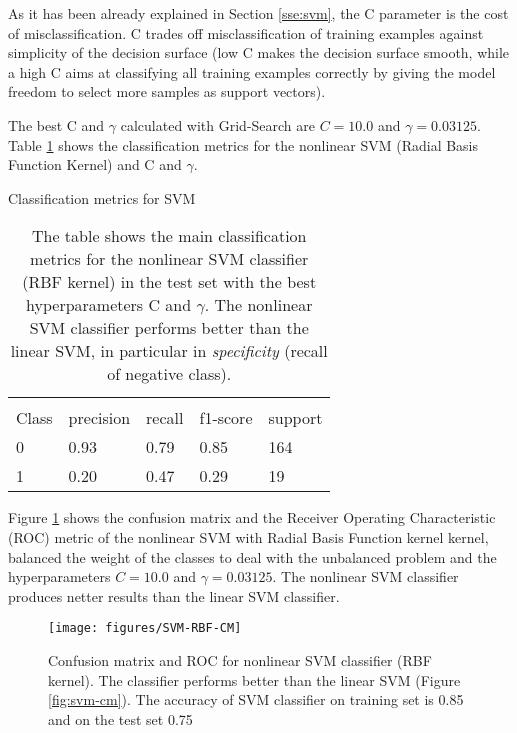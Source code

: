 \documentclass[11pt]{article}
\theoremstyle{definition}
\theoremstyle{remark}
\begin{document}
{%
As it has been already explained in Section \ref{sse:svm}, the C parameter is the cost of misclassification. C trades off misclassification of training examples against simplicity of the decision surface (low C makes the decision surface smooth, while a high C aims at classifying all training examples correctly by giving the model freedom to select more samples as support vectors). 


The best C and $\gamma$ calculated with Grid-Search are $C= 10.0$ and $\gamma= 0.03125$. %
Table \ref{tab:svmnonlinear} shows the classification metrics for the nonlinear SVM (Radial Basis Function Kernel) and C and $\gamma$.

\begin{table}[H]
\caption{Classification metrics for SVM} 
\begin{center} 
\begin{tabular}{lllll}
\hline
\multicolumn{1}{c}{} \\
Class & precision & recall & f1-score & support     \\
\hline
0 & 0.93  &    0.79   &   0.85   &    164 \\
1 & 0.20  &    0.47   &   0.29   &    19 \\
\hline
\end{tabular}
\caption{The table shows the main classification metrics for the nonlinear SVM classifier (RBF kernel) in the test set with the best hyperparameters C and $\gamma$. The nonlinear SVM classifier performs better than the linear SVM, in particular in \emph{specificity} (recall of negative class).} \label{tab:svmnonlinear} 
\end{center}
\end{table}

Figure \ref{fig:svm-rbf-cm} shows the confusion matrix and the Receiver Operating Characteristic (ROC) metric of the nonlinear SVM with Radial Basis Function kernel kernel, balanced the weight of the classes to deal with the unbalanced problem and the hyperparameters $C= 10.0$ and $\gamma= 0.03125$. The nonlinear SVM classifier produces netter results than the linear SVM classifier.

\begin{figure}[H]
        \centering
        \texttt{[image: figures/SVM-RBF-CM]}
        \caption{Confusion matrix and ROC for nonlinear SVM classifier (RBF kernel). The classifier performs better than the linear SVM (Figure \ref{fig:svm-cm}). The accuracy of SVM classifier on training set is 0.85 and on the test set 0.75} \label{fig:svm-rbf-cm}
\end{figure}

}
\end{document}
